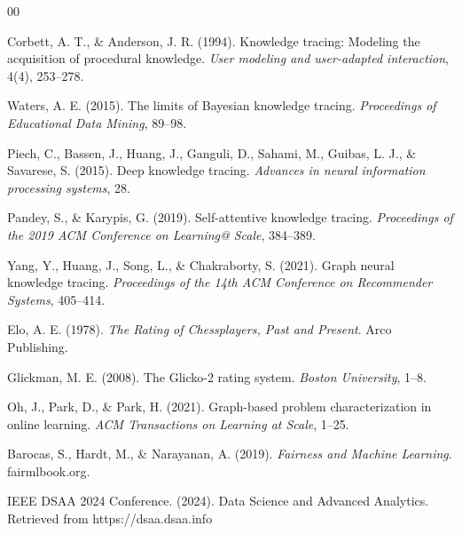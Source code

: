\documentclass[conference]{IEEEtran}
\begin{document}
\begin{thebibliography}{00}

Corbett, A. T., \& Anderson, J. R. (1994). Knowledge tracing: Modeling the acquisition of procedural knowledge. \textit{User modeling and user-adapted interaction}, 4(4), 253--278.

Waters, A. E. (2015). The limits of Bayesian knowledge tracing. \textit{Proceedings of Educational Data Mining}, 89--98.

Piech, C., Bassen, J., Huang, J., Ganguli, D., Sahami, M., Guibas, L. J., \& Savarese, S. (2015). Deep knowledge tracing. \textit{Advances in neural information processing systems}, 28.

Pandey, S., \& Karypis, G. (2019). Self-attentive knowledge tracing. \textit{Proceedings of the 2019 ACM Conference on Learning@ Scale}, 384--389.

Yang, Y., Huang, J., Song, L., \& Chakraborty, S. (2021). Graph neural knowledge tracing. \textit{Proceedings of the 14th ACM Conference on Recommender Systems}, 405--414.

Elo, A. E. (1978). \textit{The Rating of Chessplayers, Past and Present}. Arco Publishing.

Glickman, M. E. (2008). The Glicko-2 rating system. \textit{Boston University}, 1--8.

Oh, J., Park, D., \& Park, H. (2021). Graph-based problem characterization in online learning. \textit{ACM Transactions on Learning at Scale}, 1--25.

Barocas, S., Hardt, M., \& Narayanan, A. (2019). \textit{Fairness and Machine Learning}. fairmlbook.org.

IEEE DSAA 2024 Conference. (2024). Data Science and Advanced Analytics. Retrieved from https://dsaa.dsaa.info

\end{thebibliography}
\end{document}
